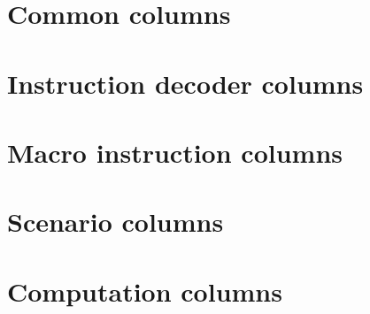 \chapter{Common columns}                   \label{mxp_v3: columns: common}                  
\chapter{Instruction decoder columns}      \label{mxp_v3: columns: instruction decoder}     
\chapter{Macro instruction columns}        \label{mxp_v3: columns: macro instruction}       
\chapter{Scenario columns}                 \label{mxp_v3: columns: scenario}                
\chapter{Computation columns}              \label{mxp_v3: columns: computation}             
